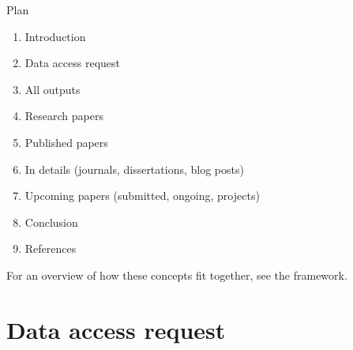 \documentclass[aspectratio=169]{beamer}
\begin{document}
\begin{frame}{Plan}
\begin{scriptsize}

\begin{enumerate}
\item Introduction \hyperlink{introduction}{}
\item Data access request \hyperlink{data}{}
\item All outputs \hyperlink{all}{}
\item Research papers \hyperlink{research}{}
\item Published papers \hyperlink{published}{}
\item In details (journals, dissertations, blog posts) \hyperlink{details}{}
\item Upcoming papers (submitted, ongoing, projects) \hyperlink{upcoming}{}
\item Conclusion \hyperlink{conclusion}{}
\item References \hyperlink{references}{}
\end{enumerate}

\begin{brickbox}
For an overview of how these concepts fit together, see the framework. \hyperlink{framework}{}
\end{brickbox}

\end{scriptsize}
\end{frame}





\section*{Data access request}
\begin{frame}
\label{data}


\end{frame}
\end{document}
